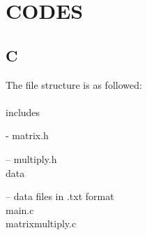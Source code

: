 \documentclass[12pt]{article}
\begin{document}
	\section{CODES}
	\subsection{C}
	The file structure is as followed:\\\\
	includes\par
	- matrix.h\par
	-- multiply.h\\
	data\par
	-- data files in .txt format\\
	main.c\\
	matrix\underline{\:}multiply.c\\\\
	
\end{document}
